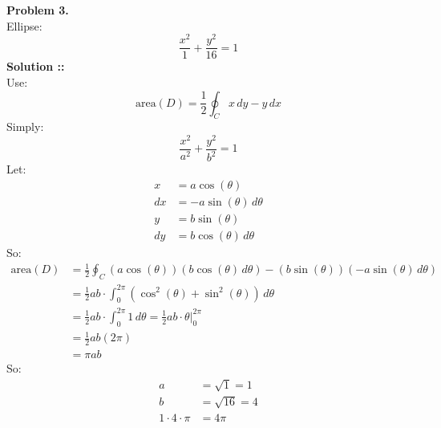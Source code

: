 \documentclass[11pt]{article}
\begin{document}

\textbf{Problem 3.} \\
Ellipse: 
$$\frac{x^2}{1}+\frac{y^2}{16}=1$$
\vspace{5px}\textbf{Solution ::} \\
Use:
$$\text{area}(D)=\frac{1}{2}\oint_C x\,dy-y\,dx$$
Simply:
$$\frac{x^2}{a^2}+\frac{y^2}{b^2}=1$$
Let:
\begin{align}
    x&=a\cos(\theta) \\
    dx&= -a\sin(\theta)\,d\theta \\
    y &= b\sin(\theta) \\
    dy &= b\cos(\theta)\,d\theta
\end{align}
So:
\begin{align}
    \text{area}(D)&=\frac{1}{2}\oint_C (a\cos(\theta))(b\cos(\theta)\,d\theta)-
    (b\sin(\theta))(-a\sin(\theta)\,d\theta) \\
    &= \frac{1}{2}ab\cdot\int_{0}^{2\pi}(\cos^2(\theta) + \sin^2(\theta))
    \,d\theta \\
    &=\frac{1}{2}ab\cdot\int_{0}^{2\pi}1\,d\theta =
    \frac{1}{2}ab\cdot\theta\bigg|^{2\pi}_0 \\
    &= \frac{1}{2}ab(2\pi) \\
    &= \pi ab
\end{align}
So:
\begin{align}
    a&=\sqrt{1} = 1 \\
    b&=\sqrt{16}=4 \\
    1\cdot 4\cdot\pi &= 4\pi
\end{align}
\end{document}
